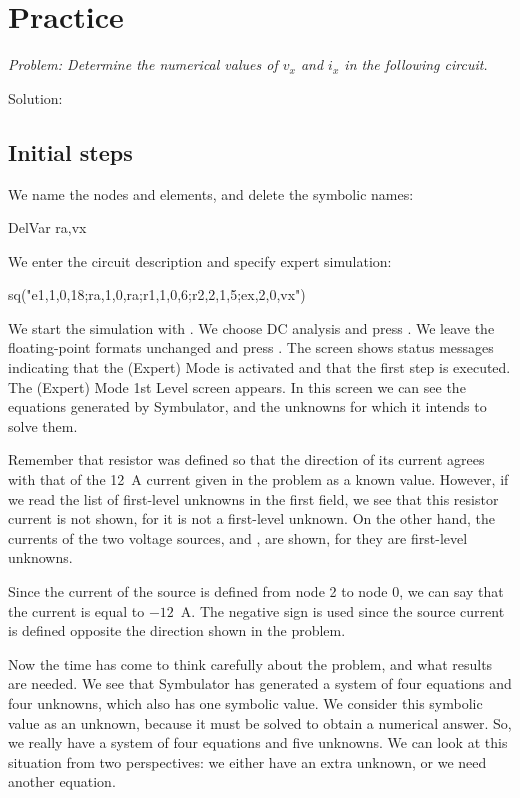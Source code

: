 \section{Practice}


\emph{Problem: Determine the numerical values of $v_x$ and $i_x$ in
the following circuit.}

Solution:

\subsection{Initial steps}

We name the nodes and elements, and delete the symbolic names:

\begin{entry}
DelVar ra,vx
\end{entry}

We enter the circuit description and specify expert simulation:

\begin{entry}
sq\expert("e1,1,0,18;ra,1,0,ra;r1,1,0,6;r2,2,1,5;ex,2,0,vx")
\end{entry}

We start the simulation with . We choose DC analysis and
press . We leave the floating-point formats unchanged and
press . The screen shows status messages indicating that
the (Expert) Mode is activated and that the first step is executed.
The (Expert) Mode 1st Level screen appears. In this screen we can
see the equations generated by Symbulator, and the unknowns for
which it intends to solve them.

Remember that resistor  was defined so that the direction
of its current agrees with that of the 12~A current given in the
problem as a known value. However, if we read the list of
first-level unknowns in the first field, we see that this resistor
current is not shown, for it is not a first-level unknown. On the
other hand, the currents of the two voltage sources,  and
, are shown, for they are first-level unknowns.

Since the current of the  source is defined from node 2 to
node 0, we can say that the current  is equal to $-12$~A.
The negative sign is used since the source current is defined
opposite the direction shown in the problem.

Now the time has come to think carefully about the problem, and what
results are needed. We see that Symbulator has generated a system of
four equations and four unknowns, which also has one symbolic value.
We consider this symbolic value as an unknown, because it must be
solved to obtain a numerical answer. So, we really have a system of
four equations and five unknowns. We can look at this situation from
two perspectives: we either have an extra unknown, or we need
another equation.


